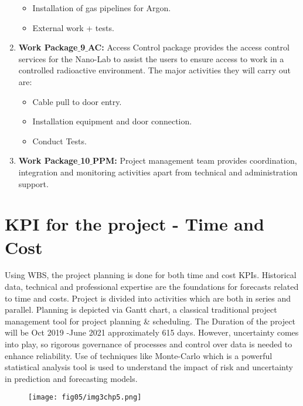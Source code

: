 \begin{enumerate}
	\begin{itemize}
		\item Installation of gas pipelines for Argon. 
		\item  External work + tests.
	\end{itemize}
	
	\item \textbf{Work Package$\_$9$\_$AC:} Access Control package provides the access control services for the Nano-Lab to assist the users to ensure access to work in a controlled radioactive environment. The major activities they will carry out are: 
	
	\begin{itemize}
		\item Cable pull to door entry.
		\item Installation equipment and door connection.
		\item Conduct Tests.
	\end{itemize}
	
	\item \textbf{Work Package$\_$10$\_$PPM:} Project management team provides coordination, integration and monitoring activities apart from technical and administration support.
	
	
\end{enumerate}


\section{KPI for the project - Time and Cost}

Using WBS, the project planning is done for both time and cost KPIs. Historical data, technical and professional expertise are the foundations for forecasts related to time and costs. Project is divided into activities which are both in series and parallel. Planning is depicted via Gantt chart, a classical traditional project management tool for project planning \& scheduling. The Duration of the project will be Oct 2019 -June 2021 approximately 615 days. However, uncertainty comes into play, so rigorous governance of processes and control over data is needed to enhance reliability. Use of techniques like Monte-Carlo which is a powerful statistical analysis tool is used to understand the impact of risk and uncertainty in prediction and forecasting models.


\begin{figure}
	\centering
	\texttt{[image: fig05/img3chp5.png]}
\end{figure}



